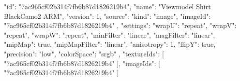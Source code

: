 {
  "id": "7ac965cf02b314f7fb6b87d1826219b4",
  "name": "Viewmodel Shirt BlackCamo2 ARM",
  "version": 1,
  "source": {
    "kind": "image",
    "imageId": "7ac965cf02b314f7fb6b87d1826219b4"
  },
  "settings": {
    "wrapU": "repeat",
    "wrapV": "repeat",
    "wrapW": "repeat",
    "minFilter": "linear",
    "magFilter": "linear",
    "mipMap": true,
    "mipMapFilter": "linear",
    "anisotropy": 1,
    "flipY": true,
    "precision": "low",
    "colorSpace": "srgb"
  },
  "textureIds": [
    "7ac965cf02b314f7fb6b87d1826219b4"
  ],
  "imageIds": [
    "7ac965cf02b314f7fb6b87d1826219b4"
  ]
}
